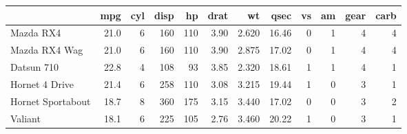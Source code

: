 \begin{table}[htbp]
\centering
{}
\label{tbl-mtcars}

\begin{tabular}{lrrrrrrrrrrr}
\toprule
  & mpg & cyl & disp & hp & drat & wt & qsec & vs & am & gear & carb\\
\midrule
Mazda RX4 & 21.0 & 6 & 160 & 110 & 3.90 & 2.620 & 16.46 & 0 & 1 & 4 & 4\\
Mazda RX4 Wag & 21.0 & 6 & 160 & 110 & 3.90 & 2.875 & 17.02 & 0 & 1 & 4 & 4\\
Datsun 710 & 22.8 & 4 & 108 & 93 & 3.85 & 2.320 & 18.61 & 1 & 1 & 4 & 1\\
Hornet 4 Drive & 21.4 & 6 & 258 & 110 & 3.08 & 3.215 & 19.44 & 1 & 0 & 3 & 1\\
Hornet Sportabout & 18.7 & 8 & 360 & 175 & 3.15 & 3.440 & 17.02 & 0 & 0 & 3 & 2\\
\addlinespace
Valiant & 18.1 & 6 & 225 & 105 & 2.76 & 3.460 & 20.22 & 1 & 0 & 3 & 1\\
\bottomrule
\end{tabular}
\end{table}
